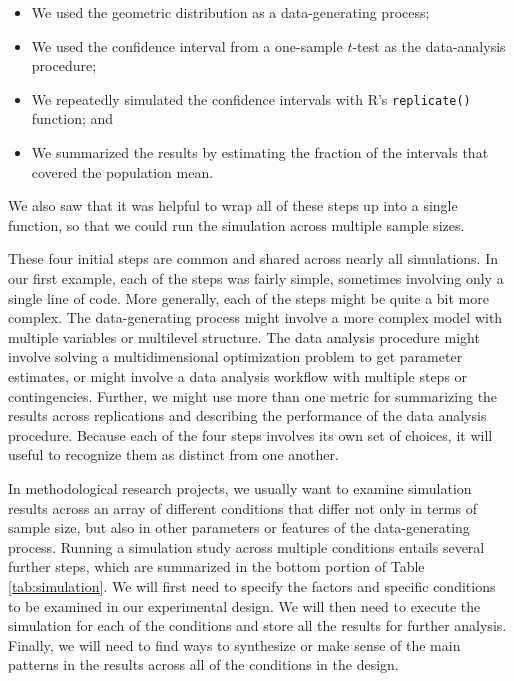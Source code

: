 \documentclass[
]{book}
\providecommand{\tightlist}{%
  \setlength{\itemsep}{0pt}\setlength{\parskip}{0pt}}
\begin{document}
\begin{itemize}
\tightlist
\item
  We used the geometric distribution as a data-generating process;
\item
  We used the confidence interval from a one-sample \(t\)-test as the data-analysis procedure;
\item
  We repeatedly simulated the confidence intervals with R's \texttt{replicate()} function; and
\item
  We summarized the results by estimating the fraction of the intervals that covered the population mean.
\end{itemize}

We also saw that it was helpful to wrap all of these steps up into a single function, so that we could run the simulation across multiple sample sizes.

These four initial steps are common and shared across nearly all simulations.
In our first example, each of the steps was fairly simple, sometimes involving only a single line of code.
More generally, each of the steps might be quite a bit more complex. The data-generating process might involve a more complex model with multiple variables or multilevel structure.
The data analysis procedure might involve solving a multidimensional optimization problem to get parameter estimates, or might involve a data analysis workflow with multiple steps or contingencies.
Further, we might use more than one metric for summarizing the results across replications and describing the performance of the data analysis procedure.
Because each of the four steps involves its own set of choices, it will useful to recognize them as distinct from one another.

In methodological research projects, we usually want to examine simulation results across an array of different conditions that differ not only in terms of sample size, but also in other parameters or features of the data-generating process.
Running a simulation study across multiple conditions entails several further steps, which are summarized in the bottom portion of Table \ref{tab:simulation}. We will first need to specify the factors and specific conditions to be examined in our experimental design. We will then need to execute the simulation for each of the conditions and store all the results for further analysis. Finally, we will need to find ways to synthesize or make sense of the main patterns in the results across all of the conditions in the design.
\end{document}
